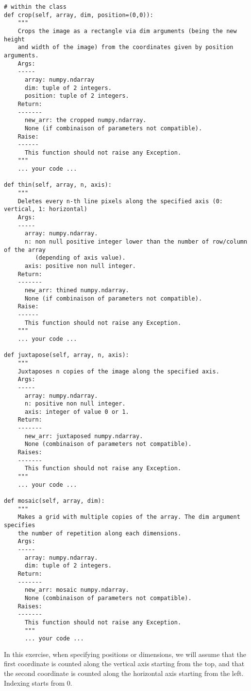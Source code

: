 \documentclass{42-en}
\begin{document}
\begin{verbatim}
# within the class
def crop(self, array, dim, position=(0,0)):
    """
    Crops the image as a rectangle via dim arguments (being the new height
    and width of the image) from the coordinates given by position arguments.
    Args:
    -----
      array: numpy.ndarray
      dim: tuple of 2 integers.
      position: tuple of 2 integers.
    Return:
    -------
      new_arr: the cropped numpy.ndarray.
      None (if combinaison of parameters not compatible).
    Raise:
    ------
      This function should not raise any Exception.
    """
    ... your code ...

def thin(self, array, n, axis):
    """
    Deletes every n-th line pixels along the specified axis (0: vertical, 1: horizontal)
    Args:
    -----
      array: numpy.ndarray.
      n: non null positive integer lower than the number of row/column of the array
         (depending of axis value).
      axis: positive non null integer.
    Return:
    -------
      new_arr: thined numpy.ndarray.
      None (if combinaison of parameters not compatible).
    Raise:
    ------
      This function should not raise any Exception.
    """
    ... your code ...

def juxtapose(self, array, n, axis):
    """
    Juxtaposes n copies of the image along the specified axis.
    Args:
    -----
      array: numpy.ndarray.
      n: positive non null integer.
      axis: integer of value 0 or 1.
    Return:
    -------
      new_arr: juxtaposed numpy.ndarray.
      None (combinaison of parameters not compatible).
    Raises:
    -------
      This function should not raise any Exception.
    """
    ... your code ...

def mosaic(self, array, dim):
    """
    Makes a grid with multiple copies of the array. The dim argument specifies
    the number of repetition along each dimensions.
    Args:
    -----
      array: numpy.ndarray.
      dim: tuple of 2 integers.
    Return:
    -------
      new_arr: mosaic numpy.ndarray.
      None (combinaison of parameters not compatible).
    Raises:
    -------
      This function should not raise any Exception.
      """
      ... your code ...
\end{verbatim}


In this exercise, when specifying positions or dimensions, we will assume
that the first coordinate is counted along the vertical axis starting from
the top, and that the second coordinate is counted along the horizontal axis
starting from the left. Indexing starts from 0.
\end{document}
